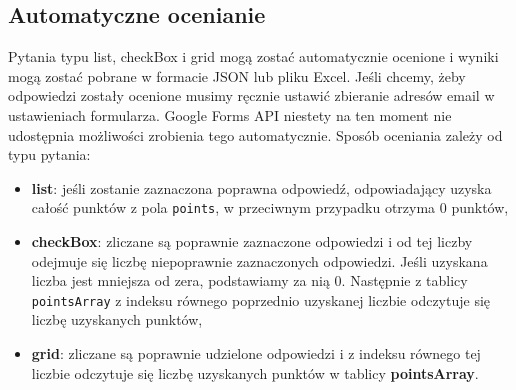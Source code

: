 \subsection{Automatyczne ocenianie}
Pytania typu list, checkBox i grid mogą zostać automatycznie ocenione i wyniki mogą zostać
pobrane w formacie JSON lub pliku Excel. Jeśli chcemy, żeby odpowiedzi zostały ocenione
musimy ręcznie ustawić zbieranie adresów email w ustawieniach formularza. Google Forms API
niestety na ten moment nie udostępnia możliwości zrobienia tego automatycznie. Sposób
oceniania zależy od typu pytania:
\begin{itemize}
  \item \textbf{list}: jeśli zostanie zaznaczona poprawna odpowiedź, odpowiadający uzyska
  całość punktów z pola \texttt{points}, w przeciwnym przypadku otrzyma 0 punktów,
  \item \textbf{checkBox}: zliczane są poprawnie zaznaczone odpowiedzi i od tej liczby
  odejmuje się liczbę niepoprawnie zaznaczonych odpowiedzi. Jeśli uzyskana liczba jest
  mniejsza od zera, podstawiamy za nią 0. Następnie z tablicy
  \texttt{pointsArray} z indeksu równego poprzednio uzyskanej liczbie odczytuje się liczbę
  uzyskanych punktów,
  \item \textbf{grid}: zliczane są poprawnie udzielone odpowiedzi i z indeksu równego
  tej liczbie odczytuje się liczbę uzyskanych punktów w tablicy \textbf{pointsArray}.
\end{itemize} 

